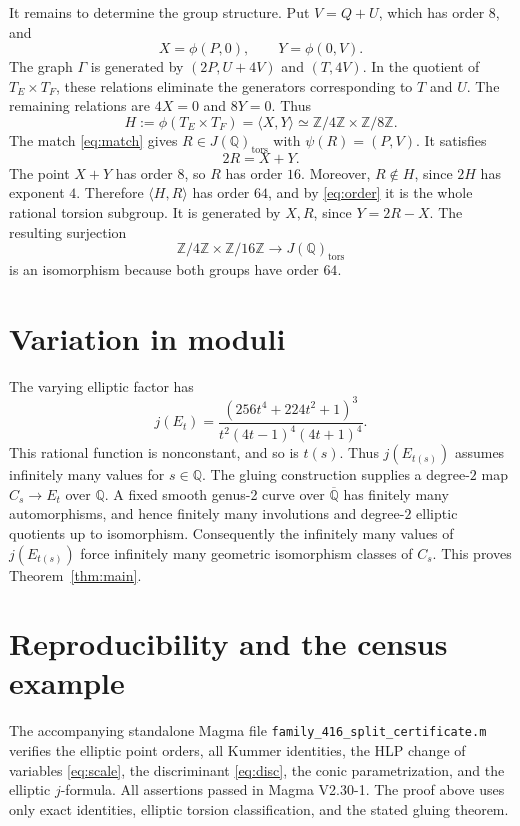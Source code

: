 \documentclass[11pt]{article}
\newcommand{\Q}{\mathbb Q}
\newcommand{\Z}{\mathbb Z}
\newcommand{\tors}{\mathrm{tors}}
\begin{document}
It remains to determine the group structure. Put \(V=Q+U\), which
has order \(8\), and
\[
 X=\phi(P,0),\qquad Y=\phi(0,V).
\]
The graph \(\Gamma\) is generated by \((2P,U+4V)\) and \((T,4V)\).
In the quotient of \(T_E\times T_F\), these relations eliminate
the generators corresponding to \(T\) and \(U\).
The remaining relations are \(4X=0\) and \(8Y=0\).
Thus
\[
 H:=\phi(T_E\times T_F)=\langle X,Y\rangle
       \simeq\Z/4\Z\times\Z/8\Z.
\]
The match \eqref{eq:match} gives \(R\in J(\Q)_{\tors}\)
with \(\psi(R)=(P,V)\). It satisfies
\[
 2R=X+Y.
\]
The point \(X+Y\) has order \(8\), so \(R\) has order \(16\).
Moreover, \(R\notin H\), since \(2H\) has exponent \(4\).
Therefore \(\langle H,R\rangle\) has order \(64\), and by
\eqref{eq:order} it is the whole rational torsion subgroup.
It is generated by \(X,R\), since \(Y=2R-X\).
The resulting surjection
\[
 \Z/4\Z\times\Z/16\Z\longrightarrow J(\Q)_{\tors}
\]
is an isomorphism because both groups have order \(64\).

\section{Variation in moduli}

The varying elliptic factor has
\[
 j(E_t)=
 \frac{(256t^4+224t^2+1)^3}
      {t^2(4t-1)^4(4t+1)^4}.
\]
This rational function is nonconstant, and so is \(t(s)\).
Thus \(j(E_{t(s)})\) assumes infinitely many values for \(s\in\Q\).
The gluing construction supplies a degree-\(2\) map
\(C_s\longrightarrow E_t\) over \(\Q\).
A fixed smooth genus-2 curve over \(\overline{\Q}\) has finitely
many automorphisms, and hence finitely many involutions and
degree-\(2\) elliptic quotients up to isomorphism.
Consequently the infinitely many values of \(j(E_{t(s)})\)
force infinitely many geometric isomorphism classes of \(C_s\).
This proves Theorem~\ref{thm:main}.

\section*{Reproducibility and the census example}

The accompanying standalone Magma file \texttt{family\_416\_split\_certificate.m} verifies
the elliptic point orders, all Kummer identities, the HLP change of
variables \eqref{eq:scale}, the discriminant \eqref{eq:disc},
the conic parametrization, and the elliptic \(j\)-formula.
All assertions passed in Magma V2.30-1.
The proof above uses only exact identities, elliptic torsion
classification, and the stated gluing theorem.
\end{document}
